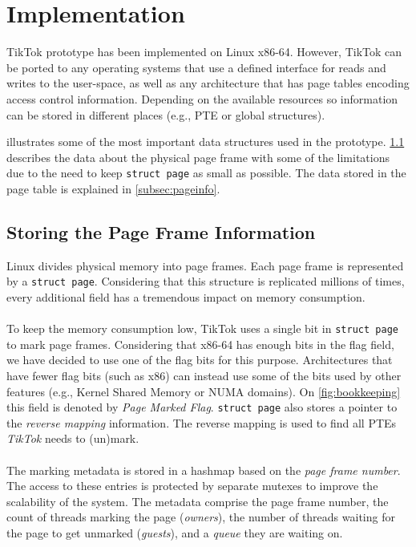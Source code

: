 \section{Implementation}
\label{sec:implementation}

TikTok prototype has been implemented on Linux x86-64. However, TikTok can be
ported to any operating systems that use a defined interface for reads and
writes to the user-space,  as well as any architecture that has page tables
encoding access control information. Depending on the available resources
so
information can be stored in different places (e.g., PTE or global structures).

 illustrates some of the most important data structures
used in the prototype.
\cref{subsec:frameinfo}  describes the data about the physical page
frame with some of the limitations due to the need to keep \texttt{struct page}
as small as possible.
The data stored in the page table is explained in \cref{subsec:pageinfo}.

\subsection{Storing the Page Frame Information}
\label{subsec:frameinfo}
Linux divides physical memory into page frames. Each page frame is represented
by a \texttt{struct page}. Considering that this structure is replicated
millions of times, every additional field has a tremendous impact on memory
consumption.
\\
\\
To keep the memory consumption low, TikTok uses a single bit in \texttt{struct
page} to mark page frames. Considering that x86-64 has enough bits in the flag
field, we have decided to use one of the flag bits for this purpose.
Architectures that have fewer flag bits (such as x86) can instead use some of
the bits used by other features (e.g., Kernel Shared Memory or NUMA domains). On
\cref{fig:bookkeeping} this field is denoted by \emph{Page Marked Flag}.
\texttt{struct page} also stores a pointer to the \emph{reverse mapping}
information. The reverse mapping is used to find all PTEs \emph{TikTok} needs to
(un)mark.
\\
\\
The marking metadata is stored in a hashmap based on the \emph{page frame
number}. The access to these entries is protected by separate mutexes to improve
the scalability of the system. The metadata comprise the page frame number, the
count of threads marking the page (\emph{owners}), the number of threads waiting
for the page to get unmarked (\emph{guests}), and a \emph{queue} they are
waiting on. 

